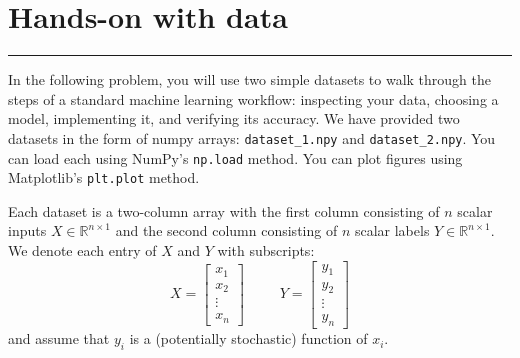 \documentclass{article}
\begin{document}
    \newpage
    \section*{Hands-on with data}
    \hrule

    In the following problem, you will use two simple datasets to  walk through the steps of a standard machine learning workflow: inspecting your data, choosing a model, implementing it, and verifying its accuracy. We have provided two datasets in the form of numpy arrays: \texttt{dataset_1.npy} and \texttt{dataset_2.npy}. You can load each using NumPy's \texttt{np.load} method. You can plot figures using Matplotlib's \texttt{plt.plot} method.

    Each dataset is a two-column array with the first column consisting of $n$ scalar inputs $X \in \mathbb{R}^{n \times 1}$ and the second column consisting of $n$ scalar labels $Y \in \mathbb{R}^{n \times 1}$. We denote each entry of $X$ and $Y$ with subscripts:
        \begin{equation*}
            X = \begin{bmatrix}
                x_{1}  \\
                x_{2}  \\
                \vdots \\
                x_{n}    
            \end{bmatrix} \hspace{30pt} Y = \begin{bmatrix}
                y_{1}  \\
                y_{2}  \\
                \vdots \\
                y_{n}    
            \end{bmatrix}
        \end{equation*}
    and assume that $y_{i}$ is a (potentially stochastic) function of $x_{i}$.
\end{document}
